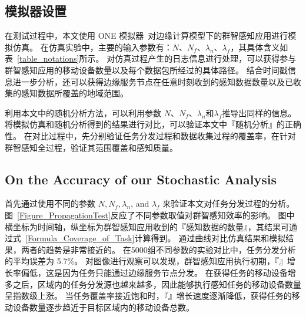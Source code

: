 \subsection{模拟器设置}
在测试过程中，本文使用 ONE 模拟器~\cite{DBLP:conf/simutools/OK09}对边缘计算模型下的群智感知应用进行模拟仿真。
在仿真实验中，主要的输入参数有：$N$、$N_f$、$\lambda_n$、$\lambda_f$，其具体含义如表~\ref{table_notations}所示。
对仿真过程产生的日志信息进行处理，可以获得参与群智感知应用的移动设备数量以及每个数据包所经过的具体路径。
结合时间戳信息进一步分析，还可以获得边缘服务节点在任意时刻收到的感知数据数量以及已收集的感知数据所覆盖的地域范围。

利用本文中的随机分析方法，可以利用参数 $N$、$N_f$、$\lambda_n$和$\lambda_f$推导出同样的信息。
将模拟仿真和随机分析得到的结果进行对比，可以验证本文中『随机分析』的正确性。
在对比过程中，先分别验证任务分发过程和数据收集过程的覆盖率，在针对群智感知全过程，验证其范围覆盖和感知质量。


\subsection{On the Accuracy of our Stochastic Analysis}

首先通过使用不同的参数 $N, N_f, \lambda_n$, and $\lambda_f$ 来验证本文对任务分发过程的分析。
图~\ref{Figure_PropagationTest}反应了不同参数取值对群智感知效率的影响。
图中横坐标为时间轴，纵坐标为群智感知应用收到的『感知数据的数量』，其结果可通过式~\eqref{Formula_Coverage_of_Task}计算得到。
通过曲线对比仿真结果和模拟结果，两者的趋势是非常接近的。
在5000组不同参数的实验对比中，任务分发分析的平均误差为 5.7\%。
对图像进行观察可以发现，群智感知应用执行初期，『』增长率偏低，这是因为任务只能通过边缘服务节点分发。
在获得任务的移动设备增多之后，区域内的任务分发源也越来越多，因此能够执行感知任务的移动设备数量呈指数级上涨。
当任务覆盖率接近饱和时，『』增长速度逐渐降低，获得任务的移动设备数量逐步趋近于目标区域内的移动设备总数。


